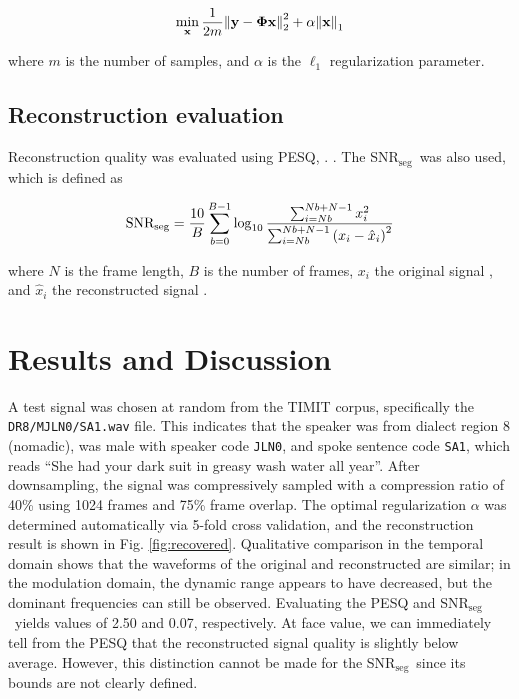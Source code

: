 \documentclass[10pt,a4paper,twoside]{article}
\newcommand{\snrseg}{SNR$_{\mathrm{seg}}$}
\begin{document}
\begin{equation}\label{eq:lasso}
	\min_{\text{\bfseries x}} \frac{1}{2m} \norm{\text{\bfseries y} - \bm\Phi \text{\bfseries x}}_2^2 + \alpha\norm{\text{\bfseries x}}_1
\end{equation}

\noindent where $m$ is the number of samples, and $\alpha$ is the $\ell_1$ regularization parameter.

\subsection{Reconstruction evaluation}\label{ssec:eval}
Reconstruction quality was evaluated using PESQ, . . The \snrseg~was also used, which is defined \cite{Loizou} as

\begin{equation}\label{eq:snrseg}
	\mathrm{SNR_{seg}} = \frac{10}{B} \sum_{b=0}^{B-1} \log_{10} \frac{\sum_{i=Nb}^{Nb+N-1} x_i^2}{\sum_{i=Nb}^{Nb+N-1} \qty(x_i - \hat{x}_i)^2}
\end{equation}

\noindent where $N$ is the frame length, $B$ is the number of frames, $x_i$  the original signal , and $\hat{x}_i$  the reconstructed signal .


\section{Results and Discussion}
A test signal was chosen at random from the TIMIT corpus, specifically the \texttt{DR8/MJLN0/SA1.wav} file. This indicates that the speaker was from dialect region 8 (nomadic), was male with speaker code \texttt{JLN0}, and spoke sentence code \texttt{SA1}, which reads ``She had your dark suit in greasy wash water all year''. After downsampling, the signal was compressively sampled with a compression ratio of 40\% using 1024 frames and 75\% frame overlap. The optimal regularization $\alpha$ was determined automatically via 5-fold cross validation, and the reconstruction result is shown in Fig. \ref{fig:recovered}. Qualitative comparison in the temporal domain shows that the waveforms of the original and reconstructed are similar; in the modulation domain, the dynamic range appears to have decreased, but the dominant frequencies can still be observed. Evaluating the PESQ and \snrseg~yields values of 2.50 and 0.07, respectively. At face value, we can immediately tell from the PESQ that the reconstructed signal quality is slightly below average. However, this distinction cannot be made for the \snrseg~since its bounds are not clearly defined.
\end{document}
